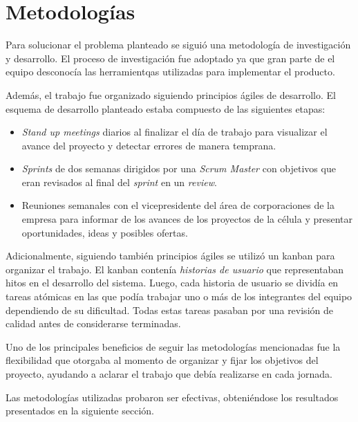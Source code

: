 \section{Metodologías}
  Para solucionar el problema planteado se siguió una metodología de investigación y 
  desarrollo.
  El proceso de investigación fue adoptado ya que gran parte de el equipo desconocía las 
  herramientqas utilizadas para implementar el producto.

  Además, el trabajo fue organizado siguiendo principios ágiles de desarrollo.
  El esquema de desarrollo planteado estaba compuesto de las siguientes etapas:
  \begin{itemize}
    \item \textit{Stand up meetings} diarios al finalizar el día de trabajo para 
      visualizar el avance del proyecto y detectar errores de manera temprana.
    \item \textit{Sprints} de dos semanas dirigidos por una \textit{Scrum Master} con 
      objetivos que eran revisados al final del \textit{sprint} en un \textit{review}.
    \item Reuniones semanales con el vicepresidente del área de corporaciones de la 
      empresa para informar de los avances de los proyectos de la célula y presentar 
      oportunidades, ideas y posibles ofertas.
  \end{itemize}

  Adicionalmente, siguiendo también principios ágiles se utilizó un kanban para organizar
  el trabajo.
  El kanban contenía \textit{historias de usuario} que representaban hitos en el 
  desarrollo del sistema.
  Luego, cada historia de usuario se dividía en tareas atómicas en las que podía trabajar 
  uno o más de los integrantes del equipo dependiendo de su dificultad.
  Todas estas tareas pasaban por una revisión de calidad antes de considerarse terminadas.

  Uno de los principales beneficios de seguir las metodologías mencionadas fue la 
  flexibilidad que otorgaba al momento de organizar y fijar los objetivos del proyecto, 
  ayudando a aclarar el trabajo que debía realizarse en cada jornada.

  Las metodologías utilizadas probaron ser efectivas, obteniéndose los resultados 
  presentados en la siguiente sección.
%
